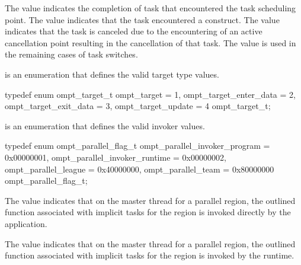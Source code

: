 The value  indicates the completion of task that
encountered the task scheduling point. The value  indicates
that the task encountered a  construct. The value  indicates
that the task is canceled due to the encountering of an active cancellation point resulting in the
cancellation of that task.
The value  is used in the remaining cases of task switches.


\label{sec:ompt_target_t}
 is an enumeration that defines the valid target type values.


\begin{ccppspecific}
\begin{omptEnum}
typedef enum ompt_target_t {
  ompt_target                         = 1,
  ompt_target_enter_data              = 2,
  ompt_target_exit_data               = 3,
  ompt_target_update                  = 4
} ompt_target_t;
\end{omptEnum}
\end{ccppspecific}





\label{sec:ompt_parallel_flag_t}
 is an enumeration that defines the valid invoker values.


\begin{ccppspecific}
\begin{omptEnum}
typedef enum ompt_parallel_flag_t {
  ompt_parallel_invoker_program = 0x00000001,
  ompt_parallel_invoker_runtime = 0x00000002,
  ompt_parallel_league          = 0x40000000,
  ompt_parallel_team            = 0x80000000
} ompt_parallel_flag_t;
\end{omptEnum}
\end{ccppspecific}

\descr

The value  indicates that on the master thread for a parallel region,
the outlined function associated with implicit tasks for the region
is invoked directly by the application.

The value  indicates that on the master thread for a parallel region, 
the outlined function associated with implicit tasks for the region
is invoked by the runtime.

